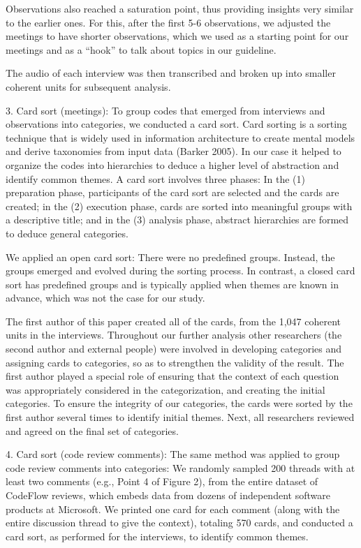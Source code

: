 Observations also reached a saturation point, thus providing insights very similar to the earlier ones. For this, after the first 5-6 observations, we adjusted the meetings to have shorter observations, which we used as a starting point for our meetings and as a ``hook'' to talk about topics in our guideline.

The audio of each interview was then transcribed and broken up into smaller
coherent units for subsequent analysis.

3. Card sort (meetings): To group codes that emerged from interviews and
observations into categories, we conducted a card sort. Card sorting is a
sorting technique that is widely used in information architecture to create
mental models and derive taxonomies from input data (Barker 2005). In our case
it helped to organize the codes into hierarchies to deduce a higher level of
abstraction and identify common themes. A card sort involves three phases: In
the (1) preparation phase, participants of the card sort are selected and the
cards are created; in the (2) execution phase, cards are sorted into meaningful
groups with a descriptive title; and in the (3) analysis phase, abstract
hierarchies are formed to deduce general categories.

We applied an open card sort: There were no predefined groups. Instead, the
groups emerged and evolved during the sorting process. In contrast, a closed
card sort has predefined groups and is typically applied when themes are known
in advance, which was not the case for our study.

The first author of this paper created all of the cards, from the 1,047
coherent units in the interviews. Throughout our further analysis other
researchers (the second author and external people) were involved in developing
categories and assigning cards to categories, so as to strengthen the validity
of the result. The first author played a special role of ensuring that the
context of each question was appropriately considered in the categorization,
and creating the initial categories. To ensure the integrity of our categories,
the cards were sorted by the first author several times to identify initial
themes. Next, all researchers reviewed and agreed on the final set of
categories.

4. Card sort (code review comments): The same method was applied to group code
review comments into categories: We randomly sampled 200 threads with at least
two comments (e.g., Point 4 of Figure 2), from the entire dataset of CodeFlow
reviews, which embeds data from dozens of independent software products at
Microsoft. We printed one card for each comment (along with the entire
discussion thread to give the context), totaling 570 cards, and conducted a
card sort, as performed for the interviews, to identify common themes.


